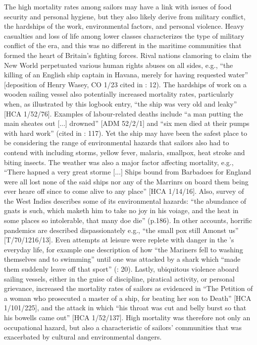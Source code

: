 The high mortality rates among sailors may have a link with issues of food security and personal hygiene, but they also likely derive from military conflict, the hardships of the work, environmental factors, and personal violence. Heavy casualties and loss of life among lower classes characterizes the type of military conflict of the era, and this was no different in the maritime communities that formed the heart of Britain’s fighting forces. Rival nations clamoring to claim the New World perpetuated various human rights abuses on all sides, e.g., “the killing of an English ship captain in Havana, merely for having requested water” [deposition of Henry Wasey, CO 1/23 cited in \citealt{Hatfield2016}: 12). The hardships of work on a wooden sailing vessel also potentially increased mortality rates, particularly when, as illustrated by this logbook entry, “the ship was very old and leaky” [HCA 1/52/76]. Examples of labour-related deaths include “a man putting the main sheates out [...] drowned” [ADM 52/2/1] and “six men died at their pumps with hard work” (cited in \citealt{AdkinsAdkins2008}: 117). Yet the ship may have been the safest place to be considering the range of environmental hazards that sailors also had to contend with including storms, yellow fever, malaria, smallpox, heat stroke and biting insects. The weather was also a major factor affecting mortality, e.g., “There hapned a very great storme [...] Ships bound from Barbadoes for England were all lost none of the said ships nor any of the Marrinrs on board them being ever heare off since to come alive to any place” [HCA 1/14/16]. Also,  survey of the West Indies describes some of its environmental hazards: “the abundance of gnats is such, which maketh him to take no joy in his voiage, and the heat in some places so intolerable, that many doe die” (p.186). In other accounts, horrific pandemics are described dispassionately e.g., “the small pox still Amonst us” [T/70/1216/13]. Even attempts at leisure were replete with danger in the ’s everyday life, for example one description of how “the Mariners fell to washing themselves and to swimming” until one was attacked by a shark which “made them suddenly leave off that sport” (\citealt{Gage1648}: 20). Lastly, ubiquitous violence aboard sailing vessels, either in the guise of discipline, piratical activity, or personal grievance, increased the mortality rates of sailors as evidenced in “The Petition of a woman who prosecuted a master of a ship, for beating her son to Death” [HCA 1/101/225], and the  attack in which “his throat was cut and belly burst so that his bowells came out” [HCA 1/52/137]. High mortality was therefore not only an occupational hazard, but also a characteristic of sailors’ communities that was exacerbated by cultural and environmental dangers. 

